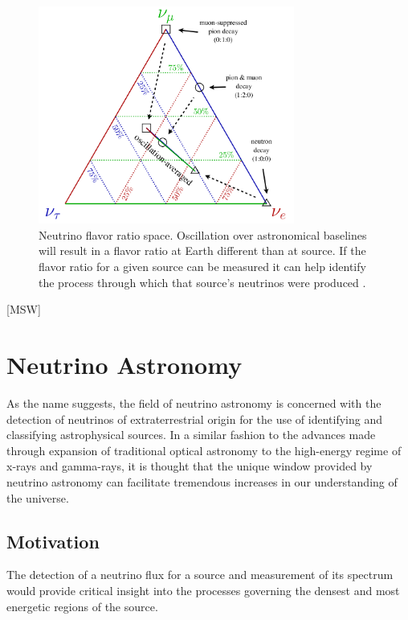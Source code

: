 \documentclass{gatech-thesis}
\begin{document}
\begin{figure}[ht]
  \begin{center}
    \includegraphics[width=0.75\textwidth,keepaspectratio]{AstroBaselineOsc.png}
  \end{center}
  \caption{Neutrino flavor ratio space. Oscillation over astronomical baselines will result in a flavor ratio at Earth different than at source. If the flavor ratio for a given source can be measured it can help identify the process through which that source's neutrinos were produced \cite{2014arXiv1412.5106I}.}
  \label{fig:baseline_osc}
\end{figure}

[MSW]

\chapter{Neutrino Astronomy}
As the name suggests, the field of neutrino astronomy is concerned with the detection of neutrinos of extraterrestrial origin for the use of identifying and classifying astrophysical sources. In a similar fashion to the advances made through expansion of traditional optical astronomy to the high-energy regime of x-rays and gamma-rays, it is thought that the unique window provided by neutrino astronomy can facilitate tremendous increases in our understanding of the universe.

\section{Motivation}

The detection of a neutrino flux for a source and measurement of its spectrum would provide critical insight into the processes governing the densest and most energetic regions of the source.
\end{document}
